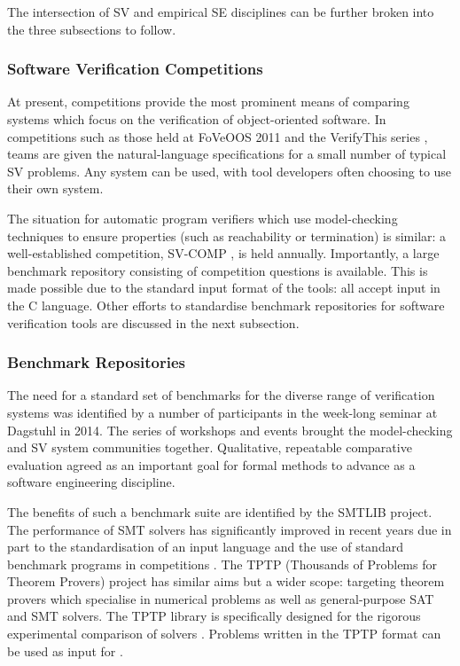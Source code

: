 The intersection of SV and empirical SE disciplines can be further broken into the three subsections to follow.      

\subsubsection{Software Verification Competitions}
\label{sub:lrsvmmbench}

At present, competitions provide the most prominent means of comparing systems which focus on the verification of object-oriented software. In competitions such as those held at FoVeOOS 2011 \cite{bormer:hal-00789525} and the VerifyThis series \cite{Huisman2015}, teams are given the natural-language specifications for a small number of typical SV problems. Any system can be used, with tool developers often choosing to use their own system.


The situation for automatic program verifiers which use model-checking techniques to ensure properties (such as reachability or termination) is similar: a well-established competition, SV-COMP \cite{SVCOMP}, is held annually. Importantly, a large benchmark repository consisting of competition questions is available. This is made possible due to the standard input format of the tools: all accept input in the C language. Other efforts to standardise benchmark repositories for software verification tools are discussed in the next subsection.  

\subsubsection{Benchmark Repositories}

The need for a standard set of benchmarks for the diverse range of verification systems was identified by a number of participants in the week-long seminar at Dagstuhl \cite{Dagstuhl} in 2014. The series of workshops and events brought the model-checking and SV system communities together. Qualitative, repeatable comparative evaluation agreed as an important goal for formal methods to advance as a software engineering discipline. 

The benefits of such a benchmark suite are identified by the SMTLIB \cite{SMTLIB} project. The performance of SMT solvers has significantly improved in recent years due in part to the standardisation of an input language and the use of standard benchmark programs in  competitions \cite{SMTEVAL2013}\cite{SVCOMP}. The TPTP (Thousands of Problems for Theorem Provers) project \cite{TPTP} has similar aims but a wider scope: targeting theorem provers which specialise in numerical problems as well as general-purpose SAT and SMT solvers. The TPTP library is specifically designed for the rigorous experimental comparison of solvers \cite{Sutcliffe200139}. Problems written in the TPTP format can be used as input for \why.

